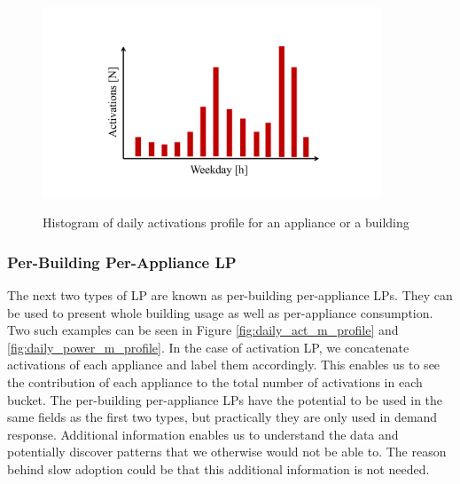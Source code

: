 \begin{figure}[H]
	\centering
	\caption{Histogram of daily activations profile for an appliance or a building}
	\includegraphics[width=0.9\textwidth]{Figures/profile_sketches/slide5.pdf}
	\label{fig:daily_act_profile}
\end{figure}

\subsubsection{Per-Building Per-Appliance LP}
The next two types of LP are known as per-building per-appliance LPs.
They can be used to present whole building usage as well as per-appliance consumption. 
Two such examples can be seen in Figure \ref{fig:daily_act_m_profile} and \ref{fig:daily_power_m_profile}.
In the case of activation LP, we concatenate activations of each appliance and label them accordingly.
This enables us to see the contribution of each appliance to the total number of activations in each bucket.
The per-building per-appliance LPs have the potential to be used in the same fields as the first two types, but practically they are only used in demand response.
Additional information enables us to understand the data and potentially discover patterns that we otherwise would not be able to.
The reason behind slow adoption could be that this additional information is not needed.

